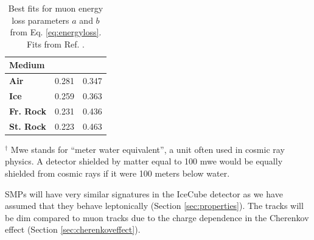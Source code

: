 \begin{table}[]
\caption{Best fits for muon energy loss parameters $a$ and $b$ from Eq. \ref{eq:energyloss}. Fits from Ref. \cite{Chirkin:2004hz}.}
\label{tab:energylossconstants}
\begin{center}
\begin{tabular}{|l |c|c|}
\hline
{\cellcolor[HTML]{F1A91E} \textbf{Medium}}   & \cellcolor[HTML]{F1A91E}{$a \left(\frac{\textrm{GeV}}{\textrm{mwe}}\right)$} & \cellcolor[HTML]{F1A91E}{$b \left(\frac{10^{-3}}{\textrm{mwe}}\right)$} \\ \hline 
\textbf{Air}    & 0.281                                                                                             & 0.347                                                                                        \\ \hline
\textbf{Ice}      & 0.259                                                                                             & 0.363                                                                                        \\ \hline
\textbf{Fr. Rock} & 0.231                                                                                             & 0.436                                                                                        \\ \hline
\textbf{St. Rock} & 0.223                                                                                             & 0.463                                                                                        \\ \hline
\end{tabular}
\end{center}
\centering ${}^\dagger$ Mwe stands for ``meter water equivalent'', a unit often used in cosmic ray physics. A detector shielded by matter equal to 100 mwe would be equally shielded from cosmic rays if it were 100 meters below water.
\end{table}

\noindent SMPs will have very similar signatures in the IceCube detector as we have assumed that they behave leptonically (Section \ref{sec:properties}). The tracks will be dim compared to muon tracks due to the charge dependence in the Cherenkov effect (Section \ref{sec:cherenkoveffect}).

